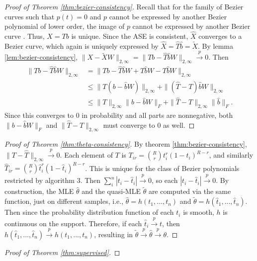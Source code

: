 \documentclass[12pt]{article}
\begin{document}
\begin{proof}[Proof of Theorem \ref{thm:bezier-consistency}]
Recall that for the family of Bezier curves such that $p(t) = 0$ and $p$ cannot be expressed by another Bezier polynomial of lower order, the image of $p$ cannot be expressed by another Bezier curve \citep{SANCHEZREYES2022102118}. 
Thus, $X = T b$ is unique. 
Since the ASE is consistent, $\hat{X}$ converges to a Bezier curve, which again is uniquely expressed by $\hat{X} = \hat{T} \hat{b} = \tilde{X}$. 
By lemma \ref{lem:bezier-consistency}, $\|X - \tilde{X} W\|_{2, \infty} = \|T b - \hat{T} \hat{b} W\|_{2, \infty} \stackrel{p}{\to} 0$.
Then
$$
\begin{aligned}
\|T b - \hat{T} \hat{b} W\|_{2, \infty} & = \|T b - \hat{T} \hat{b} W + T \hat{b} W - T \hat{b} W\|_{2,\infty} \\
& \leq \|T (b - \hat{b} W) \|_{2,\infty} + \|(\hat{T} - T) \hat{b} W\|_{2, \infty}\\
& \leq \|T\|_{2, \infty} \|b - \hat{b} W\|_F + \|\hat{T} - T\|_{2, \infty} \|\hat{b}\|_F.
\end{aligned}
$$
Since this converges to $0$ in probability and all parts are nonnegative, both $\|b - \hat{b} W\|_F$ and $\|\hat{T} - T\|_{2, \infty}$ must converge to 0 as well. 
\end{proof}

\begin{proof}[Proof of Theorem \ref{thm:theta-consistency}]
By theorem \ref{thm:bezier-consistency}, $\|T - \hat{T}\|_{2, \infty} \stackrel{p}{\to} 0$. 
Each element of $T$ is $T_{ir} = \binom{R}{r} t_i^r (1 - t_i)^{R-r}$, and similarly $\hat{T}_{ir} = \binom{R}{r} \hat{t}_i^r (1 - \hat{t}_i)^{R-r}$. 
This is unique for the class of Bezier polynomials restricted by algorithm 3. 
Then $\sum_i^n |t_i - \hat{t}_i| \stackrel{p}{\to} 0$, so each $|t_i - \hat{t}_i| \stackrel{p}{\to} 0$. 
By construction, the MLE $\hat{\theta}$ and the quasi-MLE $\tilde{\theta}$ are computed via the same function, just on different samples, i.e., $\hat{\theta} = h(t_1, ..., t_n)$ and $\tilde{\theta} = h(\hat{t}_1, ..., \hat{t}_n)$. 
Then since the probability distribution function of each $t_i$ is smooth, $h$ is continuous on the support. 
Therefore, if each $\hat{t}_i \stackrel{p}{\to} t$, then $h(\hat{t}_1, ..., \hat{t}_n) \stackrel{p}{\to} h(t_1, ..., t_n)$, resulting in $\tilde{\theta} \stackrel{p}{\to} \hat{\theta} \stackrel{p}{\to} \theta$.

\end{proof}

\begin{proof}[Proof of Theorem \ref{thm:supervised}]
\end{proof}

\newpage


\renewcommand\refname{Bibliography}

\end{document}
